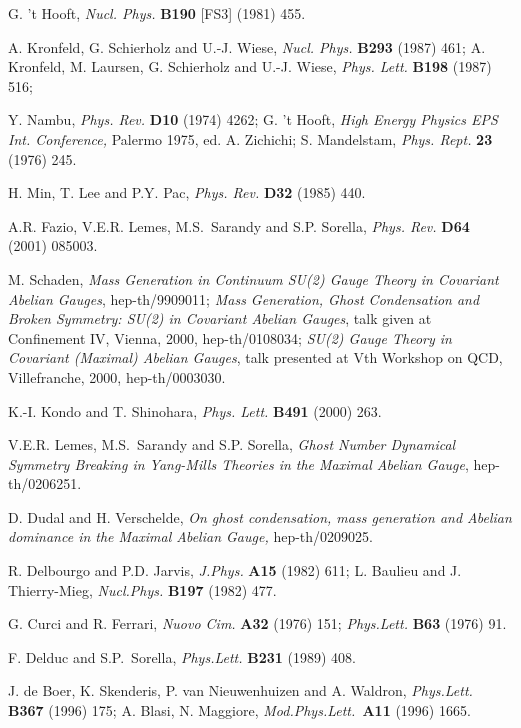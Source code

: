 \documentclass[a4paper,12pt]{article}
\begin{document}
\begin{thebibliography}{99}
  G. 't Hooft, \emph{Nucl. Phys. }\textbf{B190} [FS3] (1981) 455.

  A. Kronfeld, G. Schierholz and U.-J. Wiese, \emph{Nucl. Phys. }%
\textbf{B293} (1987) 461; A. Kronfeld, M. Laursen, G. Schierholz and U.-J.
Wiese, \emph{Phys. Lett. }\textbf{B198} (1987) 516;

  Y. Nambu, \emph{Phys. Rev. }\textbf{D10} (1974) 4262; G. 't
Hooft, \emph{High Energy Physics EPS Int. Conference, }Palermo 1975, ed. A.
Zichichi; S. Mandelstam, \emph{Phys. Rept. }\textbf{23} (1976) 245.

  H. Min, T. Lee and P.Y. Pac, \emph{Phys. Rev. }\textbf{D32}
(1985) 440.

  A.R. Fazio, V.E.R. Lemes, M.S.\ Sarandy and S.P. Sorella, \emph{%
Phys. Rev. }\textbf{D64} (2001) 085003.

  M. Schaden, \emph{Mass Generation in Continuum SU(2) Gauge
Theory in Covariant Abelian Gauges}, hep-th/9909011; \emph{Mass Generation,
Ghost Condensation and Broken Symmetry: SU(2) in Covariant Abelian Gauges},
talk given at Confinement IV, Vienna, 2000, hep-th/0108034; \emph{SU(2)
Gauge Theory in Covariant (Maximal) Abelian Gauges}, talk presented at Vth
Workshop on QCD, Villefranche, 2000, hep-th/0003030.

  K.-I. Kondo and T. Shinohara, \emph{Phys. Lett. }\textbf{B491}
(2000) 263.

  V.E.R. Lemes, M.S.\ Sarandy and S.P. Sorella, \emph{Ghost
Number Dynamical Symmetry Breaking in Yang-Mills Theories in the Maximal
Abelian Gauge}, hep-th/0206251.

  D. Dudal and H. Verschelde, \emph{On ghost condensation, mass
generation and Abelian dominance in the Maximal Abelian Gauge, }%
hep-th/0209025.

  R. Delbourgo and P.D. Jarvis, \emph{J.Phys. }\textbf{A15}
(1982) 611; L. Baulieu and J. Thierry-Mieg, \emph{Nucl.Phys. }\textbf{B197 }%
(1982) 477.

  G. Curci and R. Ferrari, \emph{Nuovo Cim. }\textbf{A32} (1976)
151; \emph{Phys.Lett. }\textbf{B63} (1976) 91.

  F. Delduc and S.P.\ Sorella, \emph{Phys.Lett. }\textbf{B231}
(1989) 408.

  J. de Boer, K. Skenderis, P. van Nieuwenhuizen and A. Waldron, 
\emph{Phys.Lett. }\textbf{B367} (1996) 175; A. Blasi, N. Maggiore, \emph{%
Mod.Phys.Lett.\ }\textbf{A11} (1996) 1665.


\end{thebibliography}
\end{document}
